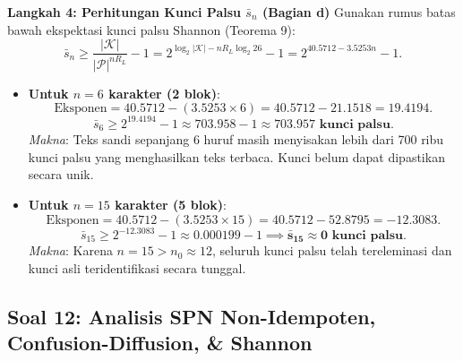 \documentclass[11pt,a4paper]{article}
\begin{document}
\noindent\textbf{Langkah 4: Perhitungan Kunci Palsu $\bar{s}_n$ (Bagian d)}
Gunakan rumus batas bawah ekspektasi kunci palsu Shannon (Teorema 9):
\begin{equation}
\bar{s}_n \ge \frac{|\mathcal{K}|}{|\mathcal{P}|^{n R_L}} - 1 = 2^{\log_2 |\mathcal{K}| - n R_L \log_2 26} - 1 = 2^{40.5712 - 3.5253 n} - 1.
\end{equation}
\begin{itemize}
    \item \textbf{Untuk $n = 6$ karakter (2 blok)}:
    \[
    \text{Eksponen} = 40.5712 - (3.5253 \times 6) = 40.5712 - 21.1518 = 19.4194.
    \]
    \[
    \bar{s}_6 \ge 2^{19.4194} - 1 \approx 703.958 - 1 \approx \mathbf{703.957\text{ kunci palsu}}.
    \]
    \textit{Makna}: Teks sandi sepanjang 6 huruf masih menyisakan lebih dari 700 ribu kunci palsu yang menghasilkan teks terbaca. Kunci belum dapat dipastikan secara unik.
    \item \textbf{Untuk $n = 15$ karakter (5 blok)}:
    \[
    \text{Eksponen} = 40.5712 - (3.5253 \times 15) = 40.5712 - 52.8795 = -12.3083.
    \]
    \[
    \bar{s}_{15} \ge 2^{-12.3083} - 1 \approx 0.000199 - 1 \implies \mathbf{\bar{s}_{15} \approx 0\text{ kunci palsu}}.
    \]
    \textit{Makna}: Karena $n = 15 > n_0 \approx 12$, seluruh kunci palsu telah tereleminasi dan kunci asli teridentifikasi secara tunggal.
\end{itemize}

\vspace{0.4cm}

\subsection{Soal 12: Analisis SPN Non-Idempoten, Confusion-Diffusion, \& Shannon}
\end{document}

